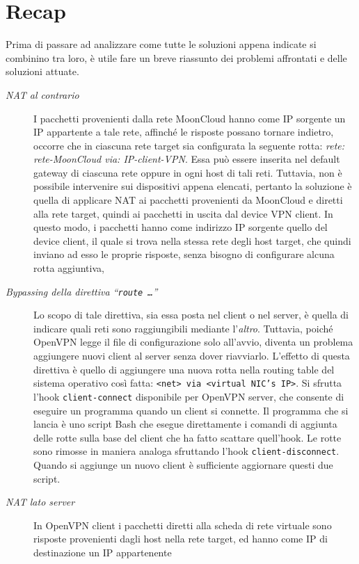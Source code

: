\section{Recap}
Prima di passare ad analizzare come tutte le soluzioni appena indicate si combinino
tra loro, è utile fare un breve riassunto dei problemi affrontati
e delle soluzioni attuate.
\begin{description}
  \item[\textit{NAT al contrario}]I pacchetti provenienti dalla rete MoonCloud
  hanno come IP sorgente un IP appartente a tale rete, affinché le risposte possano
  tornare indietro, occorre che in ciascuna rete target sia configurata la
  seguente rotta: \textit{rete: rete-MoonCloud via: IP-client-VPN}. Essa può
  essere inserita nel default gateway di ciascuna rete oppure in ogni host di tali reti.
  Tuttavia, non è possibile intervenire sui dispositivi appena elencati, pertanto
  la soluzione è quella di applicare NAT ai pacchetti provenienti da MoonCloud e
  diretti alla rete target, quindi ai pacchetti in uscita dal device VPN client.
  In questo modo, i pacchetti hanno come indirizzo IP sorgente quello del device
  client, il quale si trova nella stessa rete degli host target, che quindi inviano
  ad esso le proprie risposte, senza bisogno di configurare alcuna rotta
  aggiuntiva,
  \item[\textit{Bypassing della direttiva ``\texttt{route \ldots}''}]Lo
  scopo di tale direttiva, sia essa posta nel client o nel server, è quella di
  indicare quali reti sono raggiungibili mediante l'\textit{altro}. Tuttavia, poiché
  OpenVPN legge il file di configurazione solo all'avvio, diventa un problema aggiungere
  nuovi client al server senza dover riavviarlo. L'effetto di questa direttiva
  è quello di aggiungere una nuova rotta nella routing table del sistema operativo
  così fatta: \texttt{<net> via <virtual NIC's IP>}. Si sfrutta l'hook \texttt{client-connect}
  disponibile per OpenVPN server, che consente di eseguire un programma quando un client si
  connette. Il programma che si lancia è uno script Bash che esegue direttamente i
  comandi di aggiunta delle rotte sulla base del client che ha fatto scattare quell'hook.
  Le rotte sono rimosse in maniera analoga sfruttando l'hook \texttt{client-disconnect}.
  Quando si aggiunge un nuovo client è sufficiente aggiornare questi due script.
  \item[\textit{NAT lato server}]In OpenVPN
  client i pacchetti diretti alla scheda di rete virtuale sono risposte provenienti
  dagli host nella rete target, ed hanno come IP di destinazione un IP appartenente

\end{description}
